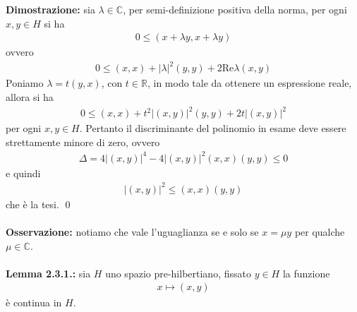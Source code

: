 \documentclass{article}
\numberwithin{equation}{subsection}
\begin{document}
\textbf{Dimostrazione:} sia $\lambda \in \mathbb{C}$, per semi-definizione positiva della norma, per ogni $x, y \in H$ si ha 
\begin{align*}
    0 \leq (x + \lambda y, x + \lambda y) 
\end{align*}
ovvero 
\begin{align*}
    0 \leq (x, x) + |\lambda|^2(y, y) + 2\mathrm{Re}\lambda(x, y) 
\end{align*}
Poniamo $\lambda = t(y, x)$, con $t \in \mathbb{R}$, in modo tale da ottenere un espressione reale, allora si ha 
\begin{align*}
    0 \leq (x, x) + t^2|(x, y)|^2(y, y) + 2t|(x, y)|^2 
\end{align*}
per ogni $x, y \in H$. Pertanto il discriminante del polinomio in esame deve essere strettamente minore di zero, ovvero 
\begin{align*}
    \Delta = 4|(x, y)|^4 - 4|(x, y)|^2(x, x)(y, y) \leq 0 
\end{align*}
e quindi 
\begin{align*}
    |(x, y)|^2 \leq (x, x)(y, y) 
\end{align*}
che è la tesi. \qed \\ \\
\textbf{Osservazione:} notiamo che vale l'uguaglianza se e solo se $x = \mu y$ per qualche $\mu \in \mathbb{C}$. \\ \\
\textbf{Lemma 2.3.1.:} sia $H$ uno spazio pre-hilbertiano, fissato $y \in H$ la funzione 
\begin{align*}
    x \mapsto (x, y) 
\end{align*}
è continua in $H$. \\
\end{document}
